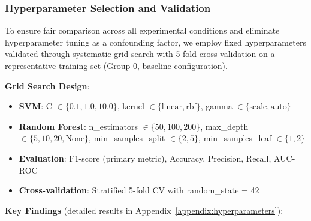 

\subsubsection{Hyperparameter Selection and Validation}

To ensure fair comparison across all experimental conditions and eliminate hyperparameter tuning as a confounding factor, we employ fixed hyperparameters validated through systematic grid search with 5-fold cross-validation on a representative training set (Group 0, baseline configuration).

\textbf{Grid Search Design}:

\begin{itemize}
    \item \textbf{SVM}: C $\in \{0.1, 1.0, 10.0\}$, kernel $\in \{\text{linear}, \text{rbf}\}$, gamma $\in \{\text{scale}, \text{auto}\}$
    \item \textbf{Random Forest}: n\_estimators $\in \{50, 100, 200\}$, max\_depth $\in \{5, 10, 20, \text{None}\}$, min\_samples\_split $\in \{2, 5\}$, min\_samples\_leaf $\in \{1, 2\}$
    \item \textbf{Evaluation}: F1-score (primary metric), Accuracy, Precision, Recall, AUC-ROC
    \item \textbf{Cross-validation}: Stratified 5-fold CV with random\_state = 42
\end{itemize}

\textbf{Key Findings} (detailed results in Appendix~\ref{appendix:hyperparameters}):

